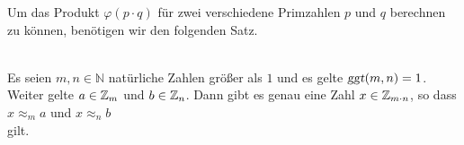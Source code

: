 Um  das Produkt $\varphi(p \cdot q)$ für zwei verschiedene Primzahlen $p$ und $q$ berechnen zu
können, benötigen wir den folgenden Satz.

\begin{Satz} \hspace*{\fill} \\
Es seien $m,n \in \mathbb{N}$ natürliche Zahlen größer als $1$ und es gelte $\textsl{ggt}(m,n) =1$.
Weiter gelte $a \in \mathbb{Z}_{m}$ und $b \in \mathbb{Z}_{n}$. 
Dann gibt es genau eine Zahl $x \in \mathbb{Z}_{m \cdot n}$, so dass
\\[0.2cm]
\hspace*{1.3cm}
$x \approx_m a$ \quad und \quad $x \approx_n b$
\\[0.2cm]
gilt.
\end{Satz}

